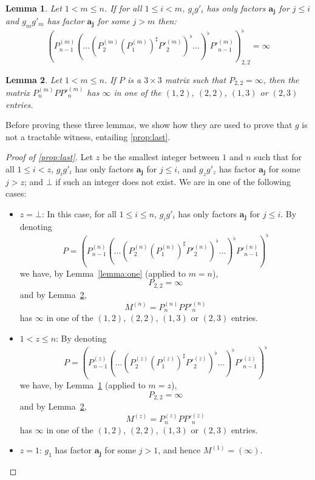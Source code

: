 \documentclass[10pt,a4paper]{amsart}
\newtheorem{lem}[lem]{Lemma}
\theoremstyle{definition}
\numberwithin{equation}{section}
\theoremstyle{remark}
\theoremstyle{remark}
\begin{document}
\begin{lem}
\label{lemma:two}
Let $1< m\leq n$. If for all $1\leq i < m$, $g_ig'_i$ has only factors $\boldsymbol{a_j}$ for $j\leq i$ and $g_mg'_m$ has factor $\boldsymbol{a_j}$ for some $j> m$ then:
$$(P^{(m)}_{n-1} (\ldots (P^{(m)}_2 (P^{(m)}_1)^\sharp P'^{(m)}_2)^\flat \ldots)^\flat P'^{(m)}_{n-1})^\flat_{2,2} = \infty$$
\end{lem}

\begin{lem}
\label{lemma:three}
Let $1< m\leq n$. If $P$ is a $3\times 3$ matrix such that $P_{2,2} = \infty$, then the matrix $P^{(m)}_{n} P P'^{(m)}_{n}$ has $\infty$ in one of the $(1,2)$, $(2,2)$, $(1,3)$ or $(2,3)$ entries. 
\end{lem}

Before proving these three lemmas,  we show how they are used to prove that $g$ is not a tractable witness, entailing \cref{prop:last}.

\begin{proof}[Proof of \cref{prop:last}]
Let $z$ be the smallest integer between $1$ and $n$ such that for all $1\leq i <z$, $g_ig'_i$ has only factors $\boldsymbol{a_j}$ for $j\leq i$, and $g_zg'_z$ has factor $\boldsymbol{a_j}$ for some $j> z$; and $\bot$ if such an integer does not exist. We are in one of the following cases:
\begin{itemize}
    \item $z = \bot$: In this case, for all $1\leq i \leq n$, $g_ig'_i$ has only factors $\boldsymbol{a_j}$ for $j\leq i$.
    By denoting
    $$P = (P^{(n)}_{n-1} (\ldots (P^{(n)}_2 (P^{(n)}_1)^\sharp P'^{(n)}_2)^\flat \ldots)^\flat P'^{(n)}_{n-1})^\flat$$
    we have, by Lemma~\ref{lemma:one} (applied to $m=n$), 
    $$P_{2,2} = \infty$$
    and by Lemma~\ref{lemma:three}, 
    $$M^{(n)} = P^{(n)}_{n} P P'^{(n)}_{n}$$
    has $\infty$ in one of the $(1,2)$, $(2,2)$, $(1,3)$ or $(2,3)$ entries. 
    \item $1 < z \leq n$: By denoting
    $$P = (P^{(z)}_{n-1} (\ldots (P^{(z)}_2 (P^{(z)}_1)^\sharp P'^{(z)}_2)^\flat \ldots)^\flat P'^{(z)}_{n-1})^\flat$$
    we have, by Lemma~\ref{lemma:two} (applied to $m=z$), 
    $$P_{2,2} = \infty$$
    and by Lemma~\ref{lemma:three}, 
    $$M^{(z)} = P^{(z)}_{n} P P'^{(z)}_{n}$$
    has $\infty$ in one of the $(1,2)$, $(2,2)$, $(1,3)$ or $(2,3)$ entries.  
    \item $z=1$: $g_1$ has factor $\boldsymbol{a_j}$ for some $j> 1$, and hence $M^{(1)} = (\infty)$.\qedhere
\end{itemize}
\end{proof}
\end{document}
